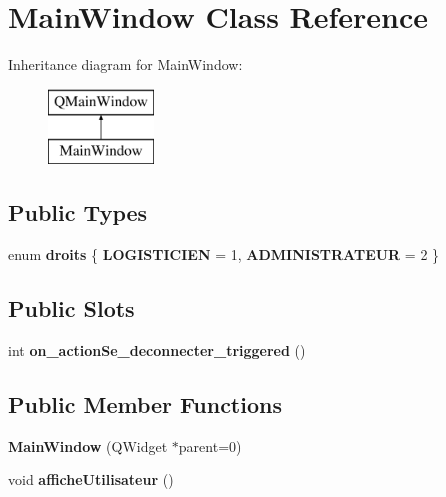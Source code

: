 \hypertarget{class_main_window}{}\section{Main\+Window Class Reference}
\label{class_main_window}
Inheritance diagram for Main\+Window\+:\begin{figure}[H]
\begin{center}
\leavevmode
\includegraphics[height=2.000000cm]{class_main_window}
\end{center}
\end{figure}
\subsection*{Public Types}
\begin{DoxyCompactItemize}
\item 
\mbox{\label{class_main_window_aa16f311e2d64ddecefd3eb2e17cdf800}} 
enum {\bfseries droits} \{ {\bfseries L\+O\+G\+I\+S\+T\+I\+C\+I\+EN} = 1, 
{\bfseries A\+D\+M\+I\+N\+I\+S\+T\+R\+A\+T\+E\+UR} = 2
 \}
\end{DoxyCompactItemize}
\subsection*{Public Slots}
\begin{DoxyCompactItemize}
\item 
\mbox{\label{class_main_window_a94d1ec5b18a39e53c1700f907fb1f08e}} 
int {\bfseries on\+\_\+action\+Se\+\_\+deconnecter\+\_\+triggered} ()
\end{DoxyCompactItemize}
\subsection*{Public Member Functions}
\begin{DoxyCompactItemize}
\item 
\mbox{\label{class_main_window_a8b244be8b7b7db1b08de2a2acb9409db}} 
{\bfseries Main\+Window} (Q\+Widget $\ast$parent=0)
\item 
\mbox{\label{class_main_window_ac600bafb6e03043944197a8eb6cf3cdb}} 
void {\bfseries affiche\+Utilisateur} ()
\end{DoxyCompactItemize}
